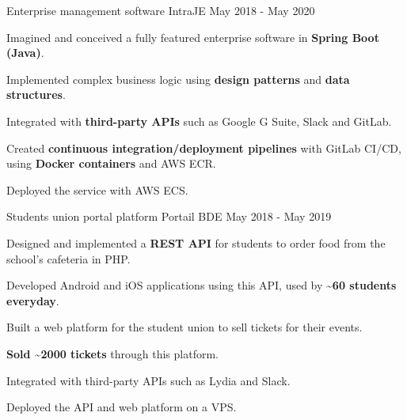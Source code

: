 

\begin{cventries}

  \cventry
    {Enterprise management software} %
    {IntraJE} %
    {} %
    {May 2018 - May 2020} %
    {
      \begin{cvitems} %
        \item {Imagined and conceived a fully featured enterprise software in \textbf{Spring Boot (Java)}.}
        \item {Implemented complex business logic using \textbf{design patterns} and \textbf{data structures}.}
        \item {Integrated with \textbf{third-party APIs} such as Google G Suite, Slack and GitLab.}
        \item {Created \textbf{continuous integration/deployment pipelines} with GitLab CI/CD, using \textbf{Docker containers} and AWS ECR.}
        \item {Deployed the service with AWS ECS.}
      \end{cvitems}
    }
  \cventry
    {Students union portal platform} %
    {Portail BDE} %
    {} %
    {May 2018 - May 2019} %
    {
      \begin{cvitems} %
        \item {Designed and implemented a \textbf{REST API} for students to order food from the school's cafeteria in PHP.}
        \item {Developed Android and iOS applications using this API, used by \textbf{\textasciitilde60 students everyday}.}
        \item {Built a web platform for the student union to sell tickets for their events.}
        \item {\textbf{Sold \textasciitilde2000 tickets} through this platform.}
        \item {Integrated with third-party APIs such as Lydia and Slack.}
        \item {Deployed the API and web platform on a VPS.}
      \end{cvitems}
    }

\end{cventries}
